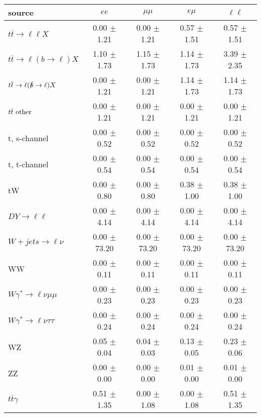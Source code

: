 \begin{tabular}{l|cccc} \hline\hline
source & $ee$ & $\mu\mu$ & $e\mu$ & $\ell\ell $ \\
\hline
$t\overline{t} \rightarrow \ell \ell X$ &  0.00 $\pm$  1.21 &  0.00 $\pm$  1.21 &  0.57 $\pm$  1.51 &  0.57 $\pm$  1.51 \\
$t\overline{t} \rightarrow \ell (b \rightarrow \ell) X$ &  1.10 $\pm$  1.73 &  1.15 $\pm$  1.73 &  1.14 $\pm$  1.73 &  3.39 $\pm$  2.35 \\
$t\overline{t} \rightarrow \ell (\slashed b \rightarrow \ell) X$ &  0.00 $\pm$  1.21 &  0.00 $\pm$  1.21 &  1.14 $\pm$  1.73 &  1.14 $\pm$  1.73 \\
        $t\overline{t}\ \rm{other}$ &  0.00 $\pm$  1.21 &  0.00 $\pm$  1.21 &  0.00 $\pm$  1.21 &  0.00 $\pm$  1.21 \\
\hline
                       t, s-channel &  0.00 $\pm$  0.52 &  0.00 $\pm$  0.52 &  0.00 $\pm$  0.52 &  0.00 $\pm$  0.52 \\
                       t, t-channel &  0.00 $\pm$  0.54 &  0.00 $\pm$  0.54 &  0.00 $\pm$  0.54 &  0.00 $\pm$  0.54 \\
                                 tW &  0.00 $\pm$  0.80 &  0.00 $\pm$  0.80 &  0.38 $\pm$  1.00 &  0.38 $\pm$  1.00 \\
\hline
         $DY \rightarrow \ell \ell$ &  0.00 $\pm$  4.14 &  0.00 $\pm$  4.14 &  0.00 $\pm$  4.14 &  0.00 $\pm$  4.14 \\
      $W+jets \rightarrow \ell \nu$ &  0.00 $\pm$ 73.20 &  0.00 $\pm$ 73.20 &  0.00 $\pm$ 73.20 &  0.00 $\pm$ 73.20 \\
                                 WW &  0.00 $\pm$  0.11 &  0.00 $\pm$  0.11 &  0.00 $\pm$  0.11 &  0.00 $\pm$  0.11 \\
\hline
$W\gamma^{*} \rightarrow \ell \nu \mu\mu$ &  0.00 $\pm$  0.23 &  0.00 $\pm$  0.23 &  0.00 $\pm$  0.23 &  0.00 $\pm$  0.23 \\
$W\gamma^{*} \rightarrow \ell \nu \tau\tau$ &  0.00 $\pm$  0.24 &  0.00 $\pm$  0.24 &  0.00 $\pm$  0.24 &  0.00 $\pm$  0.24 \\
                                 WZ &  0.05 $\pm$  0.04 &  0.04 $\pm$  0.03 &  0.13 $\pm$  0.05 &  0.23 $\pm$  0.06 \\
                                 ZZ &  0.00 $\pm$  0.00 &  0.00 $\pm$  0.00 &  0.01 $\pm$  0.00 &  0.01 $\pm$  0.00 \\
\hline
              $t\overline{t}\gamma$ &  0.51 $\pm$  1.35 &  0.00 $\pm$  1.08 &  0.00 $\pm$  1.08 &  0.51 $\pm$  1.35 \\

\end{tabular}
